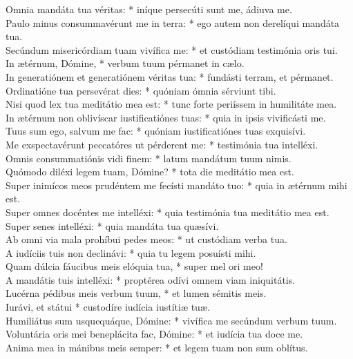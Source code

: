 {	Omnia mandáta tua véritas: * iníque persecúti sunt me, ádiuva me. \\
	Paulo minus consummavérunt me in terra: * ego autem non derelíqui mandáta tua. \\
	Secúndum misericórdiam tuam vivífica me: * et custódiam testimónia oris tui. \\
	In ætérnum, Dómine, * verbum tuum pérmanet in cælo. \\
	In generatiónem et generatiónem véritas tua: * fundásti terram, et pérmanet. \\
	Ordinatióne tua persevérat dies: * quóniam ómnia sérviunt tibi. \\
	Nisi quod lex tua meditátio mea est: * tunc forte periíssem in humilitáte mea. \\
	In ætérnum non oblivíscar iustificatiónes tuas: * quia in ipsis vivificásti me. \\
	Tuus sum ego, salvum me fac: * quóniam iustificatiónes tuas exquisívi. \\
	Me exspectavérunt peccatóres ut pérderent me: * testimónia tua intelléxi. \\
	Omnis consummatiónis vidi finem: * latum mandátum tuum nimis. \\
	Quómodo diléxi legem tuam, Dómine? * tota die meditátio mea est. \\
	Super inimícos meos prudéntem me fecísti mandáto tuo: * quia in ætérnum mihi est. \\
	Super omnes docéntes me intelléxi: * quia testimónia tua meditátio mea est. \\
	Super senes intelléxi: * quia mandáta tua quæsívi. \\
	Ab omni via mala prohíbui pedes meos: * ut custódiam verba tua. \\
	A iudíciis tuis non declinávi: * quia tu legem posuísti mihi. \\
	Quam dúlcia fáucibus meis elóquia tua, * super mel ori meo! \\
	A mandátis tuis intelléxi: * proptérea odívi omnem viam iniquitátis. \\
	Lucérna pédibus meis verbum tuum, * et lumen sémitis meis. \\
	Iurávi, et státui * custodíre iudícia iustítiæ tuæ. \\
	Humiliátus sum usquequáque, Dómine: * vivífica me secúndum verbum tuum. \\
	Voluntária oris mei beneplácita fac, Dómine: * et iudícia tua doce me. \\
	Anima mea in mánibus meis semper: * et legem tuam non sum oblítus. \\
}
